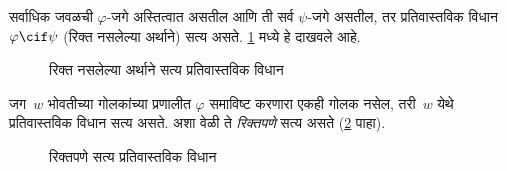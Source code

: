 सर्वाधिक जवळची $\varphi$-जगे अस्तित्वात असतील आणि
ती सर्व $\psi$-जगे असतील, तर प्रतिवास्तविक
विधान $\varphi \cif \psi$
(रिक्त नसलेल्या अर्थाने) सत्य असते.
\ref{con:min:tf:fig:true} मध्ये हे दाखवले आहे.
\begin{figure}
\begin{center}
\caption{रिक्त नसलेल्या अर्थाने सत्य प्रतिवास्तविक विधान}
\label{con:min:tf:fig:true}
\end{center}
\end{figure}
जग~$w$ भोवतीच्या गोलकांच्या
प्रणालीत $\varphi$ समाविष्ट
करणारा एकही गोलक नसेल,
तरी~$w$ येथे प्रतिवास्तविक
विधान सत्य असते. अशा वेळी
ते \emph{रिक्तपणे} सत्य
असते (\ref{con:min:tf:fig:vacuous} पाहा).
\begin{figure}
\begin{center}
\caption{रिक्तपणे सत्य प्रतिवास्तविक विधान}
\label{con:min:tf:fig:vacuous}
\end{center}
\end{figure}

